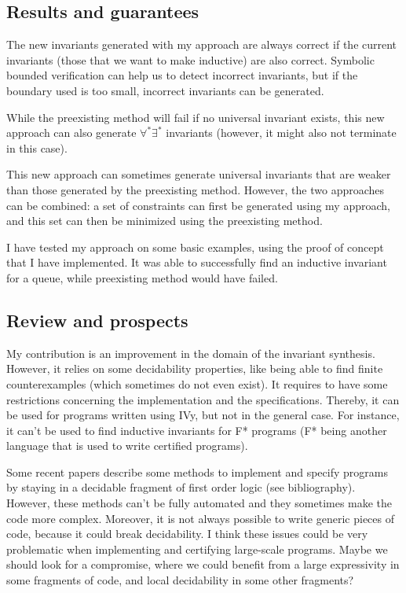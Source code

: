 \documentclass{article}
\newenvironment{point}[1]%
{\subsection*{#1}}%
{}
\begin{document}
\begin{point}{Results and guarantees}

  The new invariants generated with my approach are always correct if the current invariants (those that we want to make inductive)
  are also correct. Symbolic bounded verification can help us to detect incorrect invariants, but if the boundary used is too small,
  incorrect invariants can be generated.

  While the preexisting method will fail if no universal invariant exists,
  this new approach can also generate \(\forall^*\exists^*\) invariants (however, it might also not terminate in this case).

  This new approach can sometimes generate universal invariants that are weaker than those generated by the preexisting
  method. However, the two approaches can be combined: a set of constraints can first be generated using my approach,
  and this set can then be minimized using the preexisting method.

  I have tested my approach on some basic examples, using the proof of concept that I have implemented.
  It was able to successfully find an inductive invariant for a queue, while preexisting method would have failed.

\end{point}


\begin{point}{Review and prospects}

  My contribution is an improvement in the domain of the invariant synthesis.
  However, it relies on some decidability properties, like being able to find finite counterexamples (which sometimes do not even exist).
  It requires to have some restrictions concerning the implementation and the specifications.
  Thereby, it can be used for programs written using IVy, but not in the general case.
  For instance, it can't be used to find inductive invariants for F* programs (F* being another language that is used to write certified programs).
  
  Some recent papers describe some methods to implement and specify programs by staying in a decidable fragment of first order logic (see bibliography).
  However, these methods can't be fully automated and they sometimes make the code more complex. Moreover, it is not always possible
  to write generic pieces of code, because it could break decidability.
  I think these issues could be very problematic when implementing and certifying large-scale programs.
  Maybe we should look for a compromise, where we could benefit from a large expressivity in some fragments of code, and local decidability in some other fragments?

\end{point}
\end{document}
